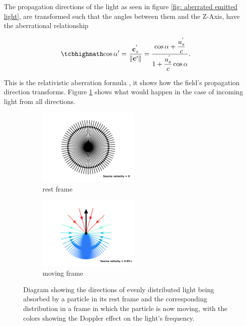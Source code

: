 The propagation directions of the light as seen in figure \ref{fig: aberrated emitted light}, are transformed such that the angles between them and the Z-Axis, have the aberrational relationship

\begin{equation}
	\label{eq: Cosine transform}
	\mhl{
		\cos\alpha{'} = \frac{\mathbf{c}_{z}^{'}}{\|\mathbf{c}{'}\|} = \dfrac{\cos\alpha + \dfrac{u_{s}^{'}}{c}}{1+\dfrac{u_{s}^{'}}{c}\cos\alpha}.
	}
\end{equation}

This is the relativistic aberration formula \cite{einstein1905electrodynamics}, it shows how the field's propagation direction transforms. Figure \ref{fig: aberrated absorbed light} shows what would happen in the case of incoming light from all directions.

\begin{figure}[ht]
	\begin{subfigure}{.49\textwidth}
		\centering
		\includegraphics[width=5cm]{images/pdf/Aberrated_velocities_inwards_restframe.pdf}
		\caption{rest frame}
	\end{subfigure}
	\begin{subfigure}{.49\textwidth}
		\centering
		\includegraphics[width=5cm]{images/pdf/Aberrated_velocities_inwards.pdf}
		\caption{moving frame}
	\end{subfigure}
	\caption{Diagram showing the directions of evenly distributed light being absorbed by a particle in its rest frame and the corresponding distribution in a frame in which the particle is now moving, with the colors showing the Doppler effect on the light's frequency.}
	\label{fig: aberrated absorbed light}
\end{figure}

